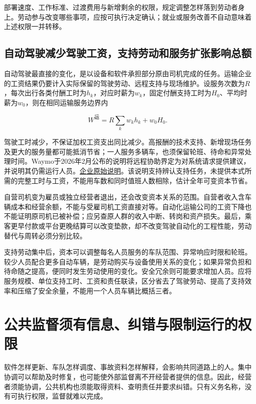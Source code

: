 \documentclass[UTF8,fontset=windows,12pt,a4paper,oneside,openany]{ctexbook}
\begin{document}
部署速度、工作标准、过渡费用与新增剩余的权限，规定调整怎样落到劳动者身上。劳动参与改变哪些事项，应按可执行决定确认；就业或服务改善不自动意味着上述权限一并转移。

\subsection{自动驾驶减少驾驶工资，支持劳动和服务扩张影响总额}

自动驾驶最直接的变化，是以设备和软件承担部分原由司机完成的任务。运输企业的工资结果仍要计入实际保留的驾驶劳动、远程支持与现场维护。设服务次数为$R$，每次出行各类付酬工时为$h_k$，对应时薪为$w_k$，固定付酬支持工时为$H_0$、平均时薪为$w_0$，则在相同运输服务边界内

\[
W^{\mathrm{运}}=R\sum_k w_kh_k+w_0H_0.
\tag{10-V1}
\]

驾驶工时减少，不保证加权工资支出同比减少。高报酬的技术支持、新增现场任务及更大的服务量都可能抵消节省；一人服务多辆车，也须保留轮班、待命和异常处理时间。Waymo于2026年2月公布的说明将远程协助界定为对系统请求提供建议，并说明其仍需运行人员。\href{https://waymo.com/blog/shorts/advice-not-control-the-role-of-remote-assistance/}{企业原始说明}。该说明支持辨认支持任务，未提供本式所需的完整工时与工资，不能用车数和同时值班人数相除，估计全年可变资本节省。

自营司机变为雇员或独立经营者退出，还会改变资本关系的范围。自营者收入含车辆成本和经营余额，不能与受雇司机工资直接对等。自动化运输公司的工资下降也不能证明原司机已被补偿；应另查原人群的收入中断、转岗和资产损失。最后，乘客更早付款或平台更晚结算可以改变垫款，却不改变驾驶自动化的工程性能，劳动替代与周转必须分别比较。

支持劳动集中后，资本可以调整每名人员服务的车队范围、异常响应时限和轮班。较少人员配合更多自动车辆，是劳动购买与设备使用关系的变化；如果异常负担和待命随之提高，便同时发生劳动使用的变化。安全冗余则可能要求增加人员。应将服务规模、单位支持工时、工资和责任联读，区分省去了驾驶劳动、提高了支持效率和压缩了安全余量，不能用一个人员车辆比概括三者。

\section{公共监督须有信息、纠错与限制运行的权限}

软件怎样更新、车队怎样调度、事故资料怎样解释，会影响共同道路上的人。集中协调可以帮助及时修复，也可能使外部监督离不开经营者提供的信息。因此，经营者须能协调，公共机构也须能取得资料、查明责任并要求纠错。只有义务名称，没有可执行权限，监督就难以完成。
\end{document}
